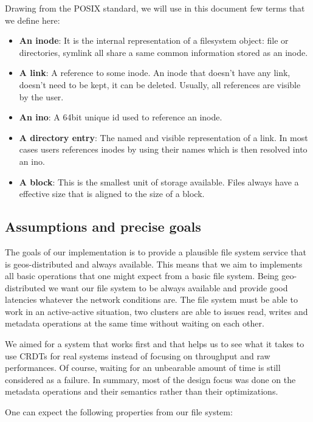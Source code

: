 \documentclass[sigplan, 10pt]{acmart}
\begin{document}
Drawing from the POSIX standard, we will use in this document few terms that
we define here:

\begin{itemize}
    \item \textbf{An inode}: It is the internal representation of a filesystem object:
    file or directories, symlink all share a same common information stored as
    an inode.
    \item \textbf{A link}: A reference to some inode. An inode that doesn't have
    any link, doesn't need to be kept, it can be deleted. Usually, all references
    are visible by the user.
    \item \textbf{An ino}: A 64bit unique id used to reference an inode.
    \item \textbf{A directory entry}: The named and visible representation of
    a link. In most cases users references inodes by using their names which
    is then resolved into an ino.
    \item \textbf{A block}: This is the smallest unit of storage available.
    Files always have a effective size that is aligned to the size of a block.
\end{itemize}

\subsection{Assumptions and precise goals}

The goals of our implementation is to provide a plausible file system service
that is geos-distributed and always available. This means that we aim to implements
all basic operations that one might expect from a basic file system. Being
geo-distributed we want our file system to be always available and provide good
latencies whatever the network conditions are. The file system must be able to work
in an active-active situation, two clusters are able to issues read, writes and metadata
operations at the same time without waiting on each other.

We aimed for a system that works first and that helps us to see what it takes
to use CRDTs for real systems instead of focusing on throughput and raw performances.
Of course, waiting for an unbearable amount of time is still considered as a failure.
In summary, most of the design focus was done on the metadata operations
and their semantics rather than their optimizations.

One can expect the following properties from our file system:
\end{document}
